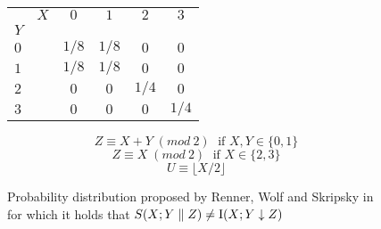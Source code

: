 	\begin{figure}[h!]
	\begin{center}
		\begin{tabular}{|l r||c|c|c|c|}
		    \hline 
		    		 &	$X$ & $0$ & $1$ & $2$ & $3$ \\ 
		    $Y$ &		  &		&			&			&		\\
		    \hline 
		    \hline
		    $0$ &		   & $1/8$ & $1/8$ & $0$ & $0$ \\ 
		    \hline 
		    $1$ &		   & $1/8$ & $1/8$ & $0$ & $0$ \\ 
		    \hline 
		    $2$ &		   & $0$ & $0$ & $1/4$ & $0$ \\ 
		    \hline 
		    $3$ &		   & $0$ & $0$ & $0$ & $1/4$ \\ 
		    \hline 
		  \end{tabular} 
	\end{center}		

		
	    $$Z \equiv X + Y\; (mod\: 2)\; \text{ if } X,Y \in \{ 0,1\}$$ 
	    $$Z \equiv X\; (mod\: 2)\; \text{ if } X \in \{ 2,3\}$$ 
	    $$U \equiv \lfloor X/2 \rfloor $$
	    \caption{Probability distribution proposed by Renner, Wolf and Skripsky in \cite{RW03} for which it holds that $S(X;Y\parallel Z) \neq \operatorname{I}(X;Y\downarrow Z)$}
	    \label{Tab:candidate}
	\end{figure}	 
	
